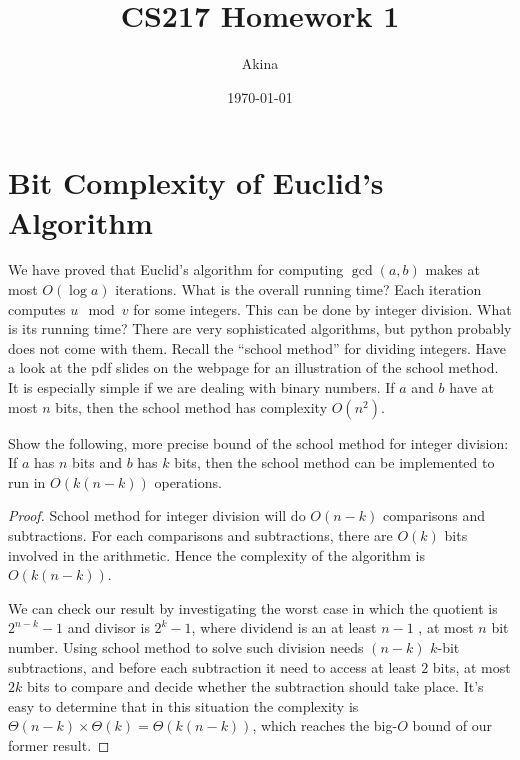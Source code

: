 \documentclass[11pt,a4paper,oneside]{article}
\renewcommand{\hwtitle} {CS217 Homework 1}
\renewcommand{\hwauthor}{Akina}
\renewcommand{\hwdate}{\today}
\begin{document}
\title{\hwtitle}
\author{\hwauthor}
\date{\hwdate}
\maketitle

\section*{Bit Complexity of Euclid's Algorithm}
We have proved that Euclid's algorithm for computing $\gcd(a,b)$ makes at most
$O(\log a)$ iterations. What is the overall running time? Each iteration computes
$u \mod v$ for some integers. This can be done by integer division. What is its running time?
There are very sophisticated algorithms, but python probably does not come with them. 
Recall the ``school method'' for dividing integers. Have a look at the pdf slides on the 
webpage for an illustration of the school method. It is especially simple if we are dealing
with binary numbers. If $a$ and $b$ have at most $n$ bits, then the school method 
has complexity $O(n^2)$.

\begin{problem}{1}
	\statement
	Show the following, more precise bound of the school method for integer division:
	If $a$ has $n$ bits and $b$ has $k$ bits, then the school method can be implemented
	to run in $O( k(n-k))$ operations.
	\solution
	\begin{proof}
	School method for integer division will do $O( n - k )$ comparisons and subtractions. For each comparisons and subtractions, there are  $O(k)$ bits involved in the arithmetic. Hence the complexity of the algorithm is \( O(k(n - k))\).

	We can check our result by investigating the worst case in which the quotient is $2 ^ {n - k} - 1$ and divisor is $2 ^ k - 1$, 
	where dividend is an at least $n - 1$ , at most $n$ bit number. 
	Using school method to solve such division needs $(n - k)$ $k$-bit subtractions, 
	and before each subtraction it need to access at least $2$ bits, 
	at most $2k$ bits to compare and decide whether the subtraction should take place.
	It's easy to determine that in this situation the complexity is $\Theta(n - k) \times \Theta(k) = \Theta(k (n - k))$, which reaches the big-$O$ bound of our former result.

	\end{proof}
\end{problem}
\end{document}
